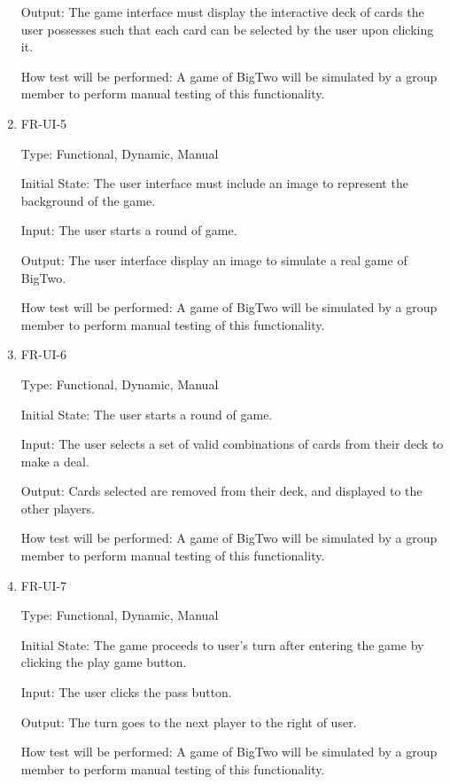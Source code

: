 \documentclass[12pt, titlepage]{article}
\begin{document}
\begin{enumerate}
Output: The game interface must display the interactive deck of cards the user possesses such  that  each  card  can  be  selected  by  the  user  upon clicking it.
					
How test will be performed: A game of BigTwo will be simulated by a group member to perform manual testing of this functionality.

\item{FR-UI-5\\}

Type: Functional, Dynamic, Manual
					
Initial State: The user interface must include an image to represent the background of the game.
					
Input: The user starts a round of game.
					
Output: The user interface display an image to simulate a real game of BigTwo.
					
How test will be performed: A game of BigTwo will be simulated by a group member to perform manual testing of this functionality.

\item{FR-UI-6\\}

Type: Functional, Dynamic, Manual
					
Initial State: The user starts a round of game.
					
Input: The user selects a set of valid combinations of cards from their deck to make a deal.
					
Output: Cards selected are removed from their deck, and displayed to the other players.
					
How test will be performed: A game of BigTwo will be simulated by a group member to perform manual testing of this functionality.

\item{FR-UI-7\\}

Type: Functional, Dynamic, Manual
					
Initial State: The game proceeds to user’s turn after entering the game by clicking the play game button.
					
Input: The user clicks the pass button.
					
Output: The turn goes to the next player to the right of user.
					
How test will be performed: A game of BigTwo will be simulated by a group member to perform manual testing of this functionality.


\end{enumerate}
\end{document}
